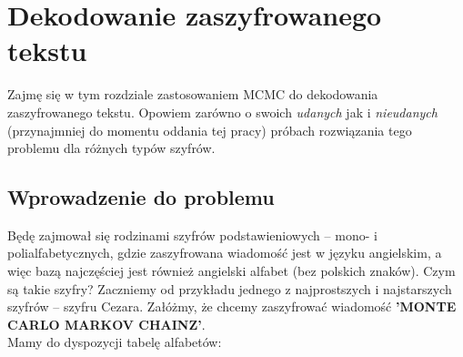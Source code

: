 \documentclass[a4paper]{article}
\begin{document}
\section{Dekodowanie zaszyfrowanego tekstu}
Zajmę się w tym rozdziale zastosowaniem MCMC do dekodowania zaszyfrowanego tekstu. Opowiem zarówno o swoich \textit{udanych} jak i \textit{nieudanych} (przynajmniej do momentu oddania tej pracy) próbach rozwiązania tego problemu dla różnych typów szyfrów.
\subsection{Wprowadzenie do problemu}
Będę zajmował się rodzinami szyfrów podstawieniowych – mono- i polialfabetycznych, gdzie zaszyfrowana wiadomość jest w języku angielskim, a więc bazą najczęściej jest również angielski alfabet (bez polskich znaków). Czym są takie szyfry? Zaczniemy od przykładu jednego z najprostszych i najstarszych szyfrów – szyfru Cezara. Załóżmy, że chcemy zaszyfrować wiadomość \textbf{'MONTE CARLO MARKOV CHAINZ'}.\\
Mamy do dyspozycji tabelę alfabetów:\\
\end{document}
